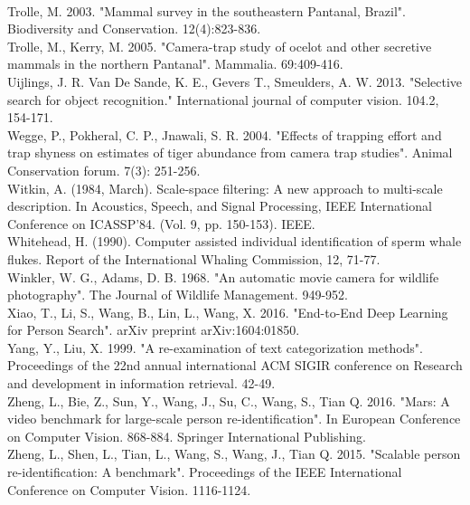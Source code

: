 \documentclass[11pt]{article}
\begin{document}
\newline
\\
Trolle, M. 2003. "Mammal survey in the southeastern Pantanal, Brazil". Biodiversity and Conservation. 12(4):823-836.
\newline
\\
Trolle, M., Kerry, M. 2005. "Camera-trap study of ocelot and other secretive mammals in the northern Pantanal". Mammalia. 69:409-416.
\newline
\\
Uijlings, J. R. Van De Sande, K. E., Gevers T., Smeulders, A. W. 2013. "Selective search for object recognition." International journal of computer vision. 104.2, 154-171.
\newline
\\
Wegge, P., Pokheral, C. P., Jnawali, S. R. 2004. "Effects of trapping effort and trap shyness on estimates of tiger abundance from camera trap studies". Animal Conservation forum. 7(3): 251-256.
\newline
\\
Witkin, A. (1984, March). Scale-space filtering: A new approach to multi-scale description. In Acoustics, Speech, and Signal Processing, IEEE International Conference on ICASSP'84. (Vol. 9, pp. 150-153). IEEE.
\newline
\\
Whitehead, H. (1990). Computer assisted individual identification of sperm whale flukes. Report of the International Whaling Commission, 12, 71-77.
\newline
\\
Winkler, W. G., Adams, D. B. 1968. "An automatic movie camera for wildlife photography". The Journal of Wildlife Management. 949-952.
\newline
\\
Xiao, T., Li, S., Wang, B., Lin, L., Wang, X. 2016. "End-to-End Deep Learning for Person Search". arXiv preprint arXiv:1604:01850.
\newline
\\
Yang, Y., Liu, X. 1999. "A re-examination of text categorization methods". Proceedings of the 22nd annual international ACM SIGIR conference on Research and development in information retrieval. 42-49.
\newline
\\
Zheng, L., Bie, Z., Sun, Y., Wang, J., Su, C., Wang, S., Tian Q. 2016. "Mars: A video benchmark for large-scale person re-identification". In European Conference on Computer Vision. 868-884. Springer International Publishing.
\newline
\\
Zheng, L., Shen, L., Tian, L., Wang, S., Wang, J., Tian Q. 2015. "Scalable person re-identification: A benchmark". Proceedings of the IEEE International Conference on Computer Vision. 1116-1124.
\end{document}
